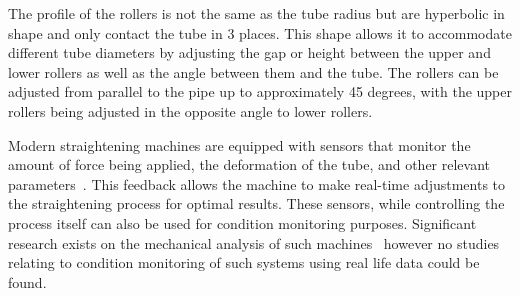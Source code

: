 \documentclass[]{article}
\begin{document}
The profile of the rollers is not the same as the tube radius but are hyperbolic in shape and only contact the tube in 3 places. This shape allows it to accommodate different tube diameters by adjusting the gap or height between the upper and lower rollers as well as the angle between them and the tube. The rollers can be adjusted from parallel to the pipe up to approximately 45 degrees, with the upper rollers being adjusted in the opposite angle to lower rollers.

Modern straightening machines are equipped with sensors that monitor the amount of force being applied, the deformation of the tube, and other relevant parameters~\cite{zhang2010study}. This feedback allows the machine to make real-time adjustments to the straightening process for optimal results. These sensors, while controlling the process itself can also be used for condition monitoring purposes. Significant research exists on the mechanical analysis of such machines~\cite{kato2014straightening, ma2020effect, ma2021analysis, yu2018theoretical, das1991mechanics, yoshimura2009effect, zhang2019modeling} however no studies relating to condition monitoring of such systems using real life data could be found.
\end{document}
